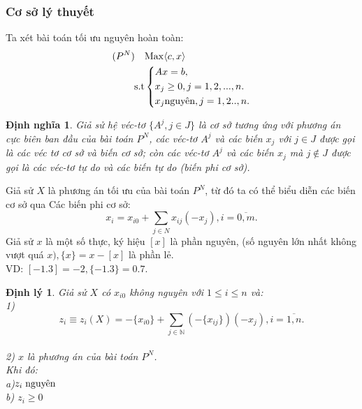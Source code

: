 \documentclass[12pt,a4paper]{report}
\newtheorem{dn}{Định nghĩa}
\newtheorem{dl}{Định lý}
\begin{document}
\subsubsection{Cơ sở lý thuyết}
Ta xét bài toán tối ưu nguyên hoàn toàn:\\
\begin{equation}\label{Gomory1}
     \begin{split}
      (P^N) \quad    & {\rm{Max}} \langle c,x \rangle\\
          \rm{s.t} &\left\{\begin{split}
            & Ax= b,\\
           & x_j \ge 0, j=1,2,...,n.\\
            & x_j \text{nguyên}, j=1,2..,n.\\
           \end{split}\right.
       \end{split}
   \end{equation}
   \begin{dn}
     Giả  sử hệ véc-tơ $\{A^j,j\in J\}$ là cơ sở tương ứng với phương án cực biên ban đầu của bài toán $P^N$, các véc-tơ $A^j$ và các biến $x_j$ với $j\in J$ được gọi là các véc tơ cơ sở và biến cơ sở; còn các véc-tơ $A^j$ và các biến $x_j$ mà $j \notin J$ được gọi là các véc-tơ tự do và các biến tự do (biến phi cơ sở).\\  
   \end{dn}
    Giả sử $X$ là phương án  tối ưu của bài toán $P^N$, từ đó ta có thể biểu diễn các biến cơ sở qua Các biến phi cơ sở:\\
   \begin{equation}\label{2.4}
       x_{i}=x_{i0} + \sum_{j \in N} x_{ij}(-x_j), i=\overline{0,m}.
   \end{equation}
    Giả sử $x$ là một số thực, ký hiệu $[x]$ là phần nguyên, (số nguyên lớn nhất không vượt quá $x), \{x\}=x-[x]$ là phần lẻ.\\
    VD: $[-1.3]=-2, \{-1.3\}=0.7$.\\
    \begin{dl}
        Giả sử $X$ có $x_{i0}$ không nguyên với $1\le i\le n$ và:\\
        1)\begin{equation}\label{2.5}
            z_i\equiv z_i(X)= -\{x_{i0}\} + \sum_{j \in \mathbb {N} }(-\{x_{ij}\})(-x_{j}), i=\overline{1,n}.
        \end{equation} \\
        2) $x$ là phương án của bài toán $P^N$.\\
        Khi đó:\\
        a)$z_i \hspace{0.1cm} \text{nguyên}$\\
        b) $z_i \ge 0$ 
        \end{dl}
\end{document}
